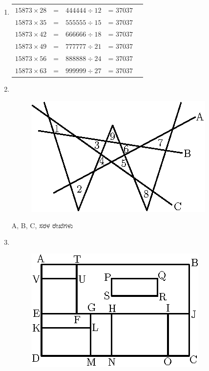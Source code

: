 \begin{enumerate}
\item
{\fontsize{11pt}{13pt}\selectfont
\begin{tabular}[t]{lllll}
$15873\times 28$ & = & $444444\div 12$ & = $37037$\\
$15873\times 35$ & = & $555555\div 15$ & = $37037$\\
$15873\times 42$ & = & $666666\div 18$ & = $37037$\\
$15873\times 49$ & = & $777777\div 21$ & = $37037$\\
$15873\times 56$ & = & $888888\div 24$ & = $37037$\\
$15873\times 63$ & = & $999999\div 27$ & = $37037$
\end{tabular}}\relax

\item
~
\vskip -0.4cm
\begin{figure}[H]
\centering
\includegraphics[scale=1.0]{images/chap6/ans14.eps}
\end{figure}

A, B, C, ಸರಳ ರೇಖೆಗಳು 

\item
~

\begin{figure}[H]
\centering
\includegraphics[scale=1.0]{images/chap6/ans15.eps}
\end{figure}


\end{enumerate}
